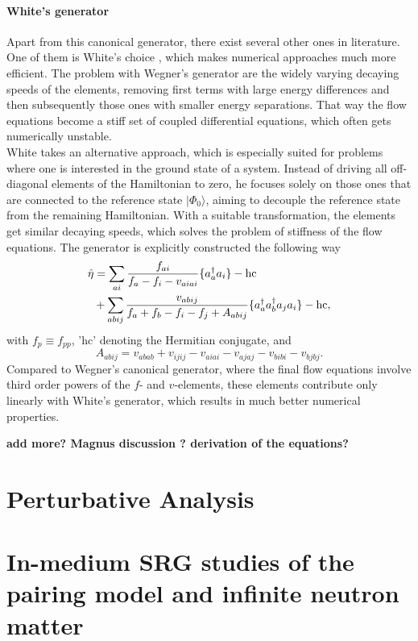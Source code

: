 \paragraph{White's generator}
Apart from this canonical generator, there exist several other ones in
literature. One of them is White's choice
\cite{White:2002fk}, which makes numerical approaches much
more efficient.  The problem with Wegner's generator are the widely
varying decaying speeds of the elements, removing first terms with
large energy differences and then subsequently those ones with smaller
energy separations.  That way the flow equations become a stiff set of
coupled differential equations, which often gets numerically
unstable.\\ White takes an alternative approach, which is especially
suited for problems where one is interested in the ground state of a
system. Instead of driving all off-diagonal elements of the
Hamiltonian to zero, he focuses solely on those ones that are
connected to the reference state $|\Phi_0\rangle$, aiming to decouple
the reference state from the remaining Hamiltonian. With a suitable
transformation, the elements get similar decaying speeds, which solves
the problem of stiffness of the flow equations.  The generator is
explicitly constructed the following way \cite{White:2002fk}
\begin{align}
\hat{\eta} &= \sum_{ai} \frac{f_{ai}}{f_a-f_i-v_{aiai}}\lbrace a_a^{\dagger}a_i\rbrace -\text{hc} \notag \\ & + \sum_{abij}
\frac{v_{abij}}{f_a+f_b-f_i-f_j+A_{abij}}\lbrace a_a^{\dagger}a_b^{\dagger}a_j
a_i\rbrace - \text{hc},
\label{eq:WhiteFull}
\end{align}
with $f_p \equiv f_{pp}$, 'hc' denoting the Hermitian conjugate, and
\[
A_{abij} = v_{abab} + v_{ijij} - v_{aiai} - v_{ajaj} - v_{bibi} -
v_{bjbj}.
\label{eq:White7}
\]
Compared to Wegner's canonical generator, where the final flow
equations involve third order powers of the $f$- and $v$-elements,
these elements contribute only linearly with White's generator, which
results in much better numerical properties.


{\bf add more? Magnus discussion ? derivation of the equations?}



\section{Perturbative Analysis}


\section{In-medium SRG studies of the pairing model and infinite neutron matter}

